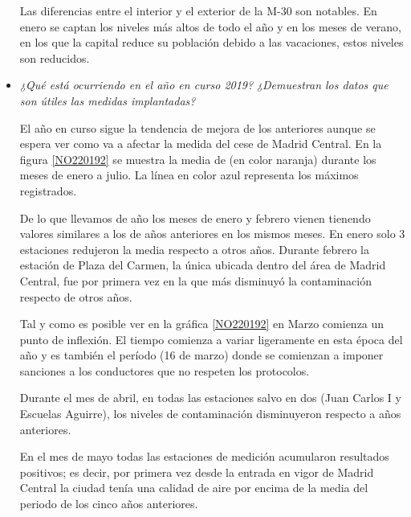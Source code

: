 \begin{itemize}
	
	Las diferencias entre el interior y el exterior de la M-30 son notables. En enero se captan los niveles más altos de todo el año y en los meses de verano, en los que la capital reduce su población debido a las vacaciones, estos niveles son reducidos. 
	
	
	\item \textit{¿Qué está ocurriendo en el año en curso 2019?} \textit{¿Demuestran los datos que son útiles las medidas implantadas?}
	
	El año en curso sigue la tendencia de mejora de los anteriores aunque se espera ver como va a afectar la medida del cese de Madrid Central. En la figura \ref{NO220192} se muestra la media de  (en color naranja) durante los meses de enero a julio. La línea en color azul representa los máximos registrados.
	
	De lo que llevamos de año los meses de enero y febrero vienen tienendo valores similares a los de años anteriores en los mismos meses. En enero solo 3 estaciones redujeron la media respecto a otros años. Durante febrero la estación de Plaza del Carmen, la única ubicada dentro del área de Madrid Central, fue por primera vez en la que más disminuyó la contaminación respecto de otros años.
	
	
	Tal y como es posible ver en la gráfica \ref{NO220192} en Marzo comienza un punto de inflexión. El tiempo comienza a variar ligeramente en esta época del año y es también el período (16 de marzo) donde se comienzan a imponer sanciones a los conductores que no respeten los protocolos. 
	
	Durante el mes de abril, en todas las estaciones salvo en dos (Juan Carlos I y Escuelas Aguirre), los niveles de contaminación disminuyeron respecto a años anteriores.
	
	En el mes de mayo todas las estaciones de medición acumularon resultados positivos; es decir, por primera vez desde la entrada en vigor de Madrid Central la ciudad tenía una calidad de aire por encima de la media del periodo de los cinco años anteriores.
\end{itemize}



	